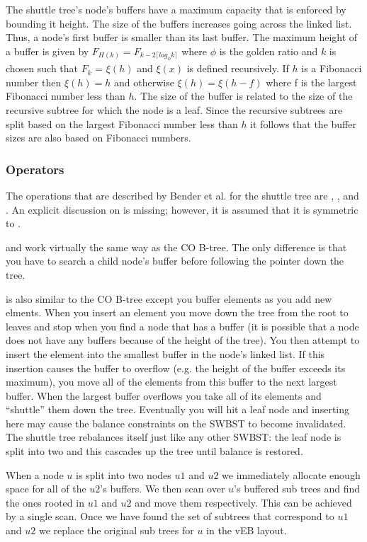 \documentclass{style}
\begin{document}
The shuttle tree's node's buffers have a maximum capacity that is enforced by
bounding it height. The size of the buffers increases going across the linked
list. Thus, a node's first buffer is smaller than its last buffer. The maximum
height of a buffer is given by $F_{H(k)} = F_{k-2 \lceil log_{\phi} k \rceil}
$ where $\phi$ is the golden ratio and $k$ is chosen such that $F_k$ =
$\xi(h)$ and $\xi(x)$ is defined recursively. If $h$ is a Fibonacci number
then $\xi(h) = h$ and otherwise $\xi(h) = \xi(h-f)$ where f is the largest
Fibonacci number less than $h$. The size of the buffer is related to the size
of the recursive subtree for which the node is a leaf. Since the recursive
subtrees are split based on the largest Fibonacci number less than $h$ it
follows that the buffer sizes are also based on Fibonacci numbers.

\subsubsection{Operators}

The operations that are described by Bender et al. for the shuttle tree are
\Search, \Insert, and \Scan. An explicit discussion on \Delete is missing;
however, it is assumed that it is symmetric to \Insert.

\Search and \Scan work virtually the same way as the CO B-tree. The only
difference is that you have to search a child node's buffer before following
the pointer down the tree.

\Insert is also similar to the CO B-tree except you buffer elements as you add
new elments. When you insert an element you move down the tree from the root
to leaves and stop when you find a node that has a buffer (it is possible that
a node does not have any buffers because of the height of the tree). You then
attempt to insert the element into the smallest buffer in the node's linked
list. If this insertion causes the buffer to overflow (e.g. the height of the
buffer exceeds its maximum), you move all of the elements from this buffer to
the next largest buffer. When the largest buffer overflows you take all of its
elements and ``shuttle'' them down the tree. Eventually you will hit a leaf
node and inserting here may cause the balance constraints on the SWBST to
become invalidated. The shuttle tree rebalances itself just like any other
SWBST: the leaf node is split into two and this cascades up the tree until
balance is restored.

When a node $u$ is split into two nodes $u1$ and $u2$ we immediately allocate
enough space for all of the $u2$'s buffers. We then scan over $u$'s buffered
sub trees and find the ones rooted in $u1$ and $u2$ and move them
respectively. This can be achieved by a single scan. Once we have found the
set of subtrees that correspond to $u1$ and $u2$ we replace the original sub
trees for $u$ in the vEB layout.
\end{document}
